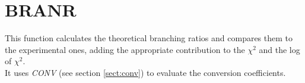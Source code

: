 \section{BRANR}
\label{sect:branr}

\noindent This function calculates the theoretical branching ratios
and compares them to the experimental ones, adding the appropriate
contribution to the $\chi^2$ and the log of $\chi^2$.\\

\noindent It uses {\em CONV} (see section \ref{sect:conv}) to evaluate
the conversion coefficients.
